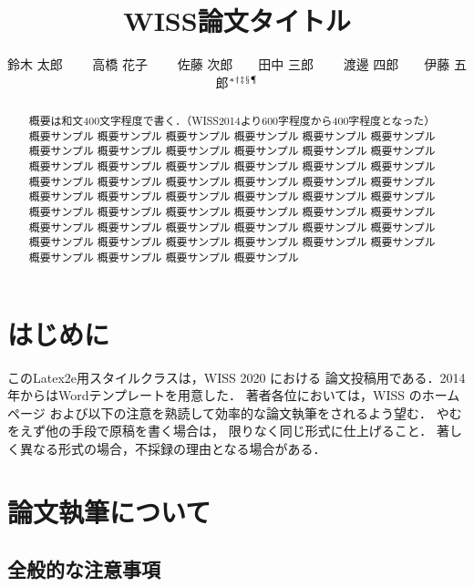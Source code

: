 \documentclass[twoside]{wiss}
\begin{document}
\title{WISS論文タイトル}
\etitle{}%
%
%
%
\author{鈴木 太郎 　　高橋 花子
　　佐藤 次郎　　田中 三郎
　　渡邊 四郎　　伊藤 五郎${}^* {}^\dag {}^\ddag {}^\mathsection
{}^\mathparagraph$}

\begin{abstract}
概要は和文400文字程度で書く．（WISS2014より600字程度から400字程度となった）
概要サンプル 概要サンプル 概要サンプル 概要サンプル 概要サンプル 概要サンプル
概要サンプル 概要サンプル 概要サンプル 概要サンプル 概要サンプル 概要サンプル
概要サンプル 概要サンプル 概要サンプル 概要サンプル 概要サンプル 概要サンプル
概要サンプル 概要サンプル 概要サンプル 概要サンプル 概要サンプル 概要サンプル
概要サンプル 概要サンプル 概要サンプル 概要サンプル 概要サンプル 概要サンプル
概要サンプル 概要サンプル 概要サンプル 概要サンプル 概要サンプル 概要サンプル
概要サンプル 概要サンプル 概要サンプル 概要サンプル 概要サンプル 概要サンプル
概要サンプル 概要サンプル 概要サンプル 概要サンプル 概要サンプル 概要サンプル
概要サンプル 概要サンプル 概要サンプル 概要サンプル
\end{abstract}

\maketitle

\section{はじめに}

このLatex2e用スタイルクラスは，WISS 2020 における
論文投稿用である．2014年からはWordテンプレートを用意した．
著者各位においては，WISS のホームページ\cite{wiss}
および以下の注意を熟読して効率的な論文執筆をされるよう望む．
やむをえず他の手段で原稿を書く場合は，
限りなく同じ形式に仕上げること．
著しく異なる形式の場合，不採録の理由となる場合がある．

\section{論文執筆について}

\subsection{全般的な注意事項}
\end{document}
